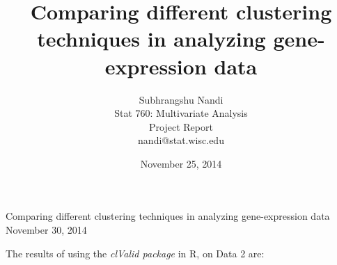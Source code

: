 \documentclass[11p]{article}
\begin{document}



\title{Comparing different clustering techniques in analyzing gene-expression data}
\author{Subhrangshu Nandi\\
  Stat 760: Multivariate Analysis\\
  Project Report \\
  nandi@stat.wisc.edu}
\date{November 25, 2014}


\begin{center}
{\Large{Comparing different clustering techniques in analyzing gene-expression data}}\\
November 30, 2014
\end{center}

\noindent
The results of using the {\emph{clValid package}} in R, on Data 2 are:
\end{document}
